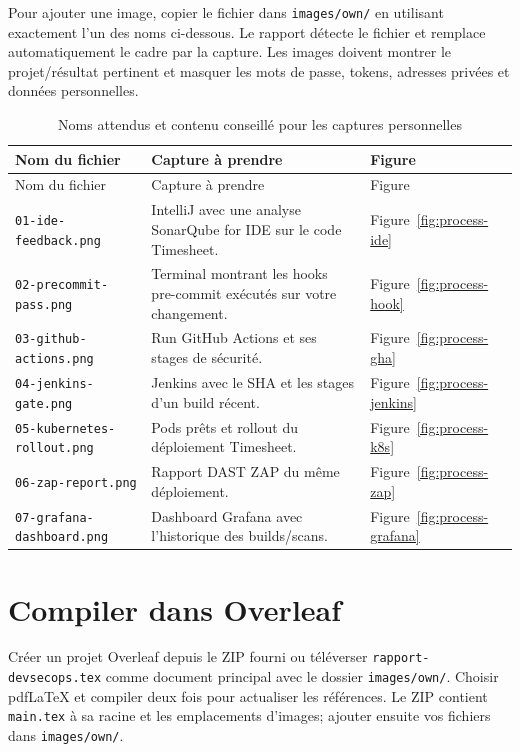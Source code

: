 \documentclass[11pt,a4paper,oneside]{report}
\newcommand{\pathfile}[1]{\nolinkurl{#1}}
\begin{document}
Pour ajouter une image, copier le fichier dans \pathfile{images/own/} en utilisant exactement l'un des noms ci-dessous. Le rapport détecte le fichier et remplace automatiquement le cadre par la capture. Les images doivent montrer le projet/résultat pertinent et masquer les mots de passe, tokens, adresses privées et données personnelles.

\begin{longtable}{@{}p{4.2cm}p{5.1cm}p{5.0cm}@{}}
\caption{Noms attendus et contenu conseillé pour les captures personnelles}\label{tab:screenshots}\\
\toprule
Nom du fichier & Capture à prendre & Figure \\
\midrule
\endfirsthead
\toprule Nom du fichier & Capture à prendre & Figure \\
\midrule\endhead
\bottomrule\endfoot
\pathfile{01-ide-feedback.png} & IntelliJ avec une analyse SonarQube for IDE sur le code Timesheet. & Figure~\ref{fig:process-ide} \\
\pathfile{02-precommit-pass.png} & Terminal montrant les hooks pre-commit exécutés sur votre changement. & Figure~\ref{fig:process-hook} \\
\pathfile{03-github-actions.png} & Run GitHub Actions et ses stages de sécurité. & Figure~\ref{fig:process-gha} \\
\pathfile{04-jenkins-gate.png} & Jenkins avec le SHA et les stages d'un build récent. & Figure~\ref{fig:process-jenkins} \\
\pathfile{05-kubernetes-rollout.png} & Pods prêts et rollout du déploiement Timesheet. & Figure~\ref{fig:process-k8s} \\
\pathfile{06-zap-report.png} & Rapport DAST ZAP du même déploiement. & Figure~\ref{fig:process-zap} \\
\pathfile{07-grafana-dashboard.png} & Dashboard Grafana avec l'historique des builds/scans. & Figure~\ref{fig:process-grafana} \\
\bottomrule
\end{longtable}

\section*{Compiler dans Overleaf}
Créer un projet Overleaf depuis le ZIP fourni ou téléverser \texttt{rapport-devsecops.tex} comme document principal avec le dossier \texttt{images/own/}. Choisir pdfLaTeX et compiler deux fois pour actualiser les références. Le ZIP contient \texttt{main.tex} à sa racine et les emplacements d'images; ajouter ensuite vos fichiers dans \texttt{images/own/}.
\end{document}
